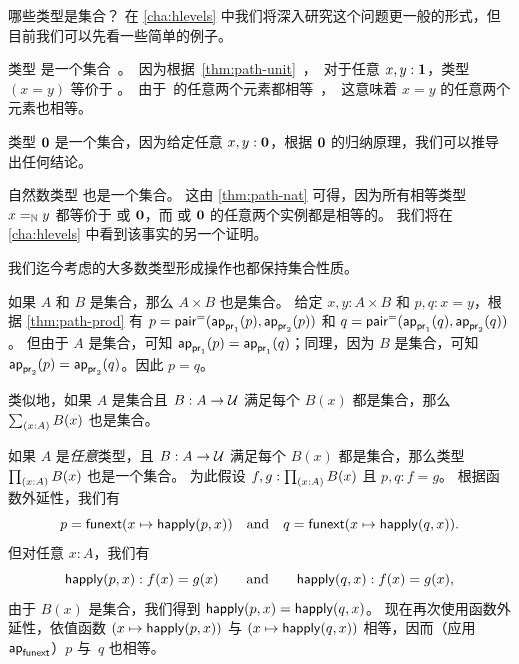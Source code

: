 哪些类型是集合？
在 \cref{cha:hlevels} 中我们将深入研究这个问题更一般的形式，但目前我们可以先看一些简单的例子。

\begin{eg}\label{eg:isset-unit}
  类型 \unit 是一个集合。
  因为根据 \cref{thm:path-unit}，对于任意 $x,y:\unit$，类型 $(x=y)$ 等价于 \unit。
  由于 \unit 的任意两个元素都相等，这意味着 $x=y$ 的任意两个元素也相等。
\end{eg}

\begin{eg}\label{eg:isset-empty}
  类型 $\emptyt$ 是一个集合，因为给定任意 $x,y:\emptyt$，根据 $\emptyt$ 的归纳原理，我们可以推导出任何结论。
\end{eg}

\begin{eg}\label{thm:nat-set}
  自然数类型 \nat 也是一个集合。
  这由 \cref{thm:path-nat} 可得，因为所有相等类型 $\id[\nat]xy$ 都等价于 \unit 或 $\emptyt$，而 \unit 或 $\emptyt$ 的任意两个实例都是相等的。
  我们将在 \cref{cha:hlevels} 中看到该事实的另一个证明。
\end{eg}

我们迄今考虑的大多数类型形成操作也都保持集合性质。

\begin{eg}\label{thm:isset-prod}
  如果 $A$ 和 $B$ 是集合，那么 $A\times B$ 也是集合。
  给定 $x,y:A\times B$ 和 $p,q:x=y$，根据 \cref{thm:path-prod} 有 $p= \pairpath(\projpath1(p),\projpath2(p))$ 和 $q= \pairpath(\projpath1(q),\projpath2(q))$。
  但由于 $A$ 是集合，可知 $\projpath1(p)=\projpath1(q)$；同理，因为 $B$ 是集合，可知 $\projpath2(p)=\projpath2(q)$。因此 $p=q$。

  类似地，如果 $A$ 是集合且 $B:A\to\type$ 满足每个 $B(x)$ 都是集合，那么 $\sm{x:A} B(x)$ 也是集合。
\end{eg}

\begin{eg}\label{thm:isset-forall}
  如果 $A$ 是\emph{任意}类型，且 $B:A\to \type$ 满足每个 $B(x)$ 都是集合，那么类型 $\prd{x:A} B(x)$ 也是一个集合。
  为此假设 $f,g:\prd{x:A} B(x)$ 且 $p,q:f=g$。
  根据函数外延性，我们有
  \begin{equation*}
    p = {\funext (x \mapsto \happly(p,x))}
    \quad\text{and}\quad
    q = {\funext (x \mapsto \happly(q,x))}.
  \end{equation*}
  但对任意 $x:A$，我们有
  \begin{equation*}
   \happly(p,x):f(x)=g(x)
   \qquad\text{and}\qquad
   \happly(q,x):f(x)=g(x),
  \end{equation*}
  由于 $B(x)$ 是集合，我们得到 $\happly(p,x) = \happly(q,x)$。
  现在再次使用函数外延性，依值函数 $(x \mapsto \happly(p,x))$ 与 $(x \mapsto \happly(q,x))$ 相等，因而（应用 $\apfunc{\funext}$）$p$ 与~$q$ 也相等。
\end{eg}

